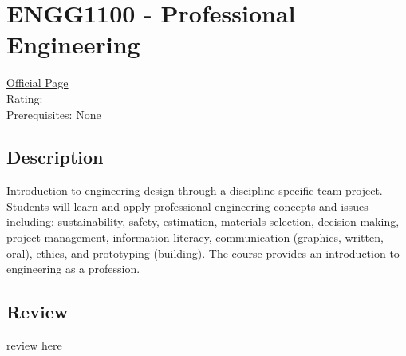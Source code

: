 \hypertarget{ENGG1100}{\section{ENGG1100 - Professional Engineering}}

\large
\textcolor{turbo_purple}{\href{https://my.uq.edu.au/programs-courses/course.html?course_code=ENGG1100}{Official Page}} \\
Rating: \cstar\cstar\cstar\cstar\ostar \\
Prerequisites: None

\normalsize
\subsection*{Description}
Introduction to engineering design through a discipline-specific team project.
Students will learn and apply professional engineering concepts and issues including: sustainability, safety, estimation, materials selection, decision making, project management, information literacy, communication (graphics, written, oral), ethics, and prototyping (building).
The course provides an introduction to engineering as a profession.

\subsection*{Review}
review here
